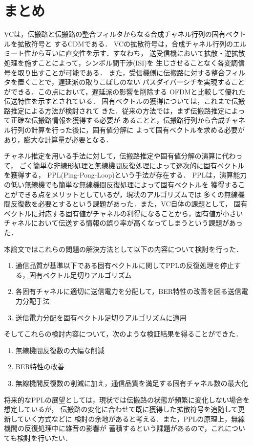 \chapter{まとめ}
VCは，伝搬路と伝搬路の整合フィルタからなる合成チャネル行列の固有ベクトルを拡散符号と
するCDMである．
VCの拡散符号は，合成チャネル行列のエルミート性から互いに直交性を示す．すなわち，
送受信機において拡散・逆拡散処理を施すことによって，シンボル間干渉(ISI)を
生じさせることなく各変調信号を取り出すことが可能である．
また，受信機側に伝搬路に対する整合フィルタを置くことで，遅延派の取りこぼしのない
パスダイバーシチを実現することができる．この点において，遅延派の影響を削除する
OFDMと比較して優れた伝送特性を示すとされている．
固有ベクトルの獲得については，これまで伝搬路推定による方法が検討されて
きた．従来の方法では，まず伝搬路推定によって正確な伝搬路情報を獲得する必要が
あることと，伝搬路行列から合成チャネル行列の計算を行った後に，固有値分解に
よって固有ベクトルを求める必要があり，膨大な計算量が必要となる．

チャネル推定を用いる手法に対して，伝搬路推定や固有値分解の演算に代わって，
ごく簡単な非線形処理と無線機間反復処理によって逐次的に固有ベクトルを獲得する，
PPL(Ping-Pong-Loop)という手法が存在する．
PPLは，演算能力の低い無線機でも簡単な無線機間反復処理によって固有ベクトルを
獲得することができる点をメリットとしているが，現状のアルゴリズムでは
多くの無線機間反復数を必要とするという課題があった．また，VC自体の課題として，
固有ベクトルに対応する固有値がチャネルの利得になることから，固有値が小さい
チャネルにおいて伝送する情報の誤り率が高くなってしまうという課題があった．

本論文ではこれらの問題の解決方法として以下の内容について検討を行った．
\begin{enumerate}
    \item 通信品質が基準以下である固有ベクトルに関してPPLの反復処理を停止する，固有ベクトル足切りアルゴリズム
    \item 各固有チャネルに適切に送信電力を分配して，BER特性の改善を図る送信電力分配手法
    \item 送信電力分配を固有ベクトル足切りアルゴリズムに適用
\end{enumerate}
そしてこれらの検討内容について，次のような検証結果を得ることができた．
\begin{enumerate}
    \item 無線機間反復数の大幅な削減
    \item BER特性の改善
    \item 無線機間反復数の削減に加え，通信品質を満足する固有チャネル数の最大化
\end{enumerate}
将来的なPPLの展望としては，現状では伝搬路の状態が頻繁に変化しない場合を想定しているが，
伝搬路の変化に合わせて既に獲得した拡散符号を追随して更新していく方式などに
検討の余地があると考える．また，PPLの原理上，無線機間の反復処理中に雑音の影響が
蓄積するという課題があるので，これについても検討を行いたい．
